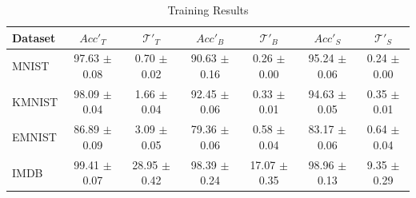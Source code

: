 \begin{table}
	\centering
	\caption{Training Results}
	\label{tab:train-table-dkd}
	\begin{tabular}{lcccccc}
		\hline
		Dataset & $Acc'_T$ & $\mathcal{T}'_T$ & $Acc'_B$ & $\mathcal{T}'_B$ & $Acc'_S$ & $\mathcal{T}'_S$ \\
		\hline
		MNIST & 97.63 \newline $\pm$ 0.08 & 0.70 \newline $\pm$ 0.02 & 90.63 \newline $\pm$ 0.16 & 0.26 \newline $\pm$ 0.00 & 95.24 \newline $\pm$ 0.06 & 0.24 \newline $\pm$ 0.00 \\
		KMNIST & 98.09 \newline $\pm$ 0.04 & 1.66 \newline $\pm$ 0.04 & 92.45 \newline $\pm$ 0.06 & 0.33 \newline $\pm$ 0.01 & 94.63 \newline $\pm$ 0.05 & 0.35 \newline $\pm$ 0.01 \\
		EMNIST & 86.89 \newline $\pm$ 0.09 & 3.09 \newline $\pm$ 0.05 & 79.36 \newline $\pm$ 0.06 & 0.58 \newline $\pm$ 0.04 & 83.17 \newline $\pm$ 0.06 & 0.64 \newline $\pm$ 0.04 \\
		IMDB & 99.41 \newline $\pm$ 0.07 & 28.95 \newline $\pm$ 0.42 & 98.39 \newline $\pm$ 0.24 & 17.07 \newline $\pm$ 0.35 & 98.96 \newline $\pm$ 0.13 & 9.35 \newline $\pm$ 0.29 \\
		\hline
	\end{tabular}
\end{table}